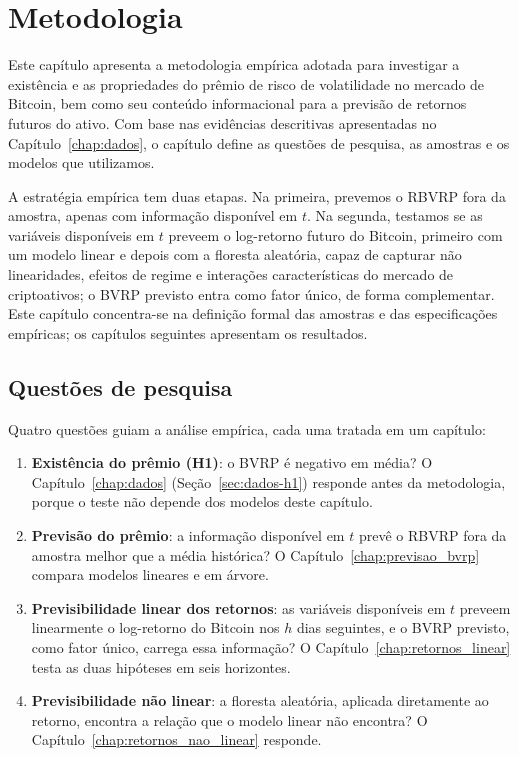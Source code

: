 \chapter{Metodologia}
\label{chap:metodologia}

Este capítulo apresenta a metodologia empírica adotada para investigar a
existência e as propriedades do prêmio de risco de volatilidade no mercado de
Bitcoin, bem como seu conteúdo informacional para a previsão de retornos futuros
do ativo. Com base nas evidências descritivas apresentadas no
Capítulo~\ref{chap:dados}, o capítulo define as questões de pesquisa, as
amostras e os modelos que utilizamos.

A estratégia empírica tem duas etapas. Na primeira, prevemos o RBVRP
fora da amostra, apenas com informação disponível em $t$. Na segunda, testamos se
as variáveis disponíveis em $t$ preveem o log-retorno futuro do Bitcoin,
primeiro com um modelo linear e depois com a floresta aleatória, capaz de
capturar não linearidades, efeitos de regime e interações características do
mercado de criptoativos; o BVRP previsto entra como fator único, de forma
complementar. Este capítulo concentra-se na definição formal das amostras e das
especificações empíricas; os capítulos seguintes apresentam os
resultados.

\section{Questões de pesquisa}
\label{sec:met-questoes}

Quatro questões guiam a análise empírica, cada uma tratada em um capítulo:

\begin{enumerate}
    \item \textbf{Existência do prêmio (H1)}: o BVRP é negativo em média? O
          Capítulo~\ref{chap:dados} (Seção~\ref{sec:dados-h1}) responde antes da
          metodologia, porque o teste não depende dos modelos deste capítulo.
    \item \textbf{Previsão do prêmio}: a informação disponível em $t$ prevê o
          RBVRP fora da amostra melhor que a média histórica? O
          Capítulo~\ref{chap:previsao_bvrp} compara modelos lineares e em árvore.
    \item \textbf{Previsibilidade linear dos retornos}: as variáveis
          disponíveis em $t$ preveem linearmente o log-retorno do Bitcoin nos
          $h$ dias seguintes, e o BVRP previsto, como fator único, carrega essa
          informação? O Capítulo~\ref{chap:retornos_linear} testa as duas
          hipóteses em seis horizontes.
    \item \textbf{Previsibilidade não linear}: a floresta aleatória, aplicada
          diretamente ao retorno, encontra a relação que o modelo linear não
          encontra? O Capítulo~\ref{chap:retornos_nao_linear} responde.
\end{enumerate}

